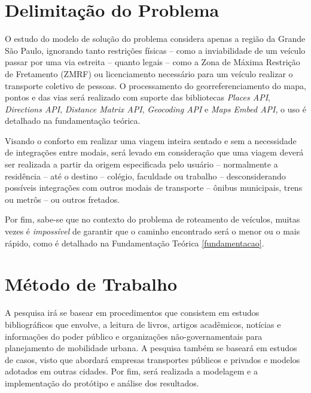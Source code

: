 \section{Delimitação do Problema}
O estudo do modelo de solução do problema considera apenas a região da Grande São Paulo, ignorando tanto restrições físicas -- como a inviabilidade de um veículo passar por uma via estreita -- quanto legais -- como a Zona de Máxima Restrição de Fretamento (ZMRF) ou licenciamento necessário para um veículo realizar o transporte coletivo de pessoas. O processamento do georreferenciamento do mapa, pontos e das vias será realizado com suporte das bibliotecas \emph{Places API}, \emph{Directions API}, \emph{Distance Matrix API}, \emph{Geocoding API} e \emph{Maps Embed API}, o uso é detalhado na fundamentação teórica.

Visando o conforto em realizar uma viagem inteira sentado e sem a necessidade de integrações entre modais, será levado em consideração que uma viagem deverá ser realizada a partir da origem especificada pelo usuário -- normalmente a residência -- até o destino -- colégio, faculdade ou trabalho -- desconsiderando possíveis integrações com outros modais de transporte -- ônibus municipais, trens ou metrôs -- ou outros fretados.

Por fim, sabe-se que no contexto do problema de roteamento de veículos, muitas vezes é \emph{impossível} de garantir que o caminho encontrado será o menor ou o mais rápido, como é detalhado na Fundamentação Teórica \ref{fundamentacao}.

\section{Método de Trabalho}\label{metodo-trabalho}
A pesquisa irá se basear em procedimentos que consistem em estudos bibliográficos que envolve, a leitura de livros, artigos acadêmicos, notícias e informações do poder público e organizações não-governamentais para planejamento de mobilidade urbana. A pesquisa também se baseará em estudos de casos, visto que abordará empresas transportes públicos e privados e modelos adotados em outras cidades. Por fim, será realizada a modelagem e a implementação do protótipo e análise dos resultados.

